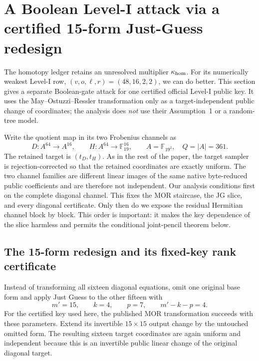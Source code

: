 \documentclass[11pt]{article}
\newcommand{\F}{\mathbb F}
\begin{document}
\section{A Boolean Level-I attack via a certified 15-form Just-Guess redesign}
\label{sec:jg-finite-gate}

The homotopy ledger retains an unresolved multiplier $\kappa_{\rm hom}$.  For
its numerically weakest Level-I row, $(v,o,\ell,r)=(48,16,2,2)$, we can do
better.  This section gives a separate Boolean-gate attack for one certified
official Level-I public key.  It uses the May--Ostuzzi--Ressler transformation
only as a target-independent public change of coordinates; the analysis does
\emph{not} use their Assumption~1 or a random-tree model.

Write the quotient map in its two Frobenius channels as
\[
  D:A^{64}\longrightarrow A^{16},\qquad
  H:A^{64}\longrightarrow\F_{19}^{16},
  \qquad A=\F_{19^2},\quad Q=|A|=361.
\]
The retained target is $(t_D,t_H)$.  As in the rest of the paper, the target
sampler is rejection-corrected so that the retained coordinates are exactly
uniform.  The two channel families are different linear images of the same
native byte-reduced public coefficients and are therefore not independent.
Our analysis conditions first on the complete diagonal channel.  This fixes
the MOR staircase, the JG slice, and every diagonal certificate.  Only then do
we expose the residual Hermitian channel block by block.  This order is
important: it makes the key dependence of the slice harmless and permits the
conditional joint-pencil theorem below.

\subsection{The 15-form redesign and its fixed-key rank certificate}

Instead of transforming all sixteen diagonal equations, omit one original
base form and apply Just Guess to the other fifteen with
\begin{equation}
  m'=15,\qquad k=4,\qquad p=7,\qquad m'-k-p=4.
  \label{eq:jg-redesign-parameters}
\end{equation}
For the certified key used here, the published MOR transformation succeeds
with these parameters.  Extend its invertible $15\times15$ output change by
the untouched omitted form.  The resulting sixteen target coordinates are
again uniform and independent because this is an invertible public linear
change of the original diagonal target.
\end{document}
